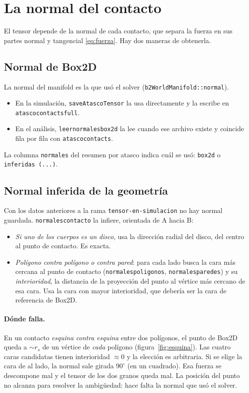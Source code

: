 \documentclass[11pt,a4paper]{article}
\newcommand{\codeus}{\textunderscore\allowbreak}
\newcommand{\code}[1]{\texttt{\begingroup\let\_\codeus#1\endgroup}}
\begin{document}
\section{La normal del contacto}
\label{sec:normal}

El tensor depende de la normal de cada contacto, que separa la fuerza en
sus partes normal y tangencial \eqref{eq:fuerza}. Hay dos maneras de
obtenerla.

\subsection{Normal de Box2D}

La normal del manifold es la que usó el solver
(\code{b2WorldManifold::}\allowbreak\code{normal}).
\begin{itemize}
  \item En la simulación, \code{saveAtascoTensor} la usa directamente y
    la escribe en \code{atasco\_contacts\_full}.
  \item En el análisis, \code{leer\_normales\_box2d} la lee cuando ese
    archivo existe y coincide fila por fila con \code{atasco\_contacts}.
\end{itemize}
La columna \code{normales} del resumen por atasco indica cuál se usó:
\code{box2d} o \code{inferidas (...)}.

\subsection{Normal inferida de la geometría}

Con los datos anteriores a la rama \code{tensor-en-simulacion} no hay
normal guardada. \code{normales\_contacto} la infiere, orientada de A
hacia B:
\begin{itemize}
  \item \emph{Si uno de los cuerpos es un disco}, usa la dirección radial
    del disco, del centro al punto de contacto. Es exacta.
  \item \emph{Polígono contra polígono o contra pared}: para cada lado
    busca la cara más cercana al punto de contacto (\code{normales\_poligonos},
    \code{normales\_paredes}) y su \emph{interioridad}, la distancia de
    la proyección del punto al vértice más cercano de esa cara. Usa la
    cara con mayor interioridad, que debería ser la cara de referencia de
    Box2D.
\end{itemize}

\paragraph{Dónde falla.} En un contacto \emph{esquina contra esquina}
entre dos polígonos, el punto de Box2D queda a $\sim r_s$ de un vértice
de \emph{cada} polígono (figura~\ref{fig:esquina}). Las cuatro caras
candidatas tienen interioridad $\approx 0$ y la elección es arbitraria.
Si se elige la cara de al lado, la normal sale girada $90^\circ$ (en un
cuadrado). Esa fuerza se descompone mal y el tensor de los dos granos
queda mal. La posición del punto no alcanza para resolver la ambigüedad:
hace falta la normal que usó el solver.
\end{document}
